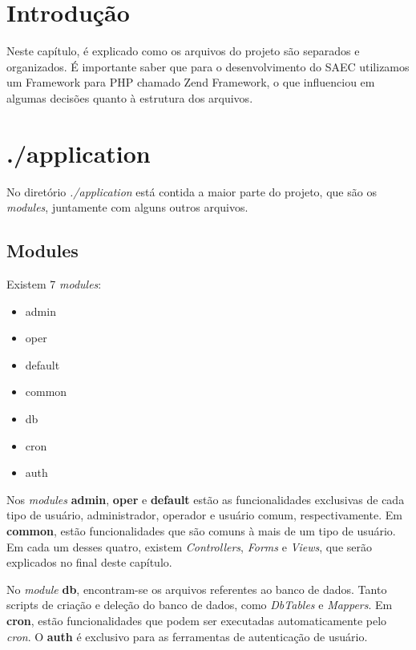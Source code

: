 
\section{Introdução}
Neste capítulo, é explicado como os arquivos do projeto são separados e organizados. É importante saber que para o desenvolvimento do SAEC utilizamos um Framework para PHP chamado Zend Framework, o que influenciou em algumas decisões quanto à estrutura dos arquivos.


\section{./application}
No diretório \textit{./application} está contida a maior parte do projeto, que são os \textit{modules}, juntamente com alguns outros arquivos.

\subsection{Modules}
Existem 7 \textit{modules}:
    \begin{itemize}
        \item admin
        \item oper
        \item default
        \item common
        \item db
        \item cron
        \item auth
    \end{itemize}

Nos \textit{modules} \textbf{admin}, \textbf{oper} e \textbf{default} estão as funcionalidades exclusivas de cada tipo de usuário, administrador, operador e usuário comum, respectivamente. Em \textbf{common}, estão funcionalidades que são comuns à mais de um tipo de usuário. Em cada um desses quatro, existem \textit{Controllers}, \textit{Forms} e \textit{Views}, que serão explicados no final deste capítulo.

No \textit{module} \textbf{db}, encontram-se os arquivos referentes ao banco de dados. Tanto scripts de criação e deleção do banco de dados, como \textit{DbTables} e \textit{Mappers}. Em \textbf{cron}, estão funcionalidades que podem ser executadas automaticamente pelo \textit{cron}. O \textbf{auth} é exclusivo para as ferramentas de autenticação de usuário.

